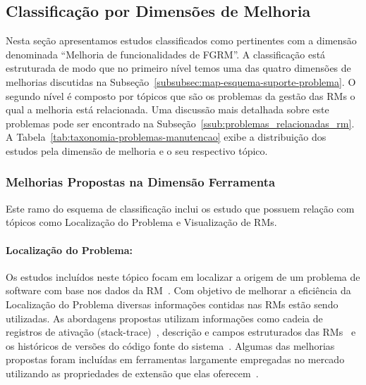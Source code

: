 \subsection{Classificação por Dimensões de Melhoria}
\label{sub:extensões_para_problemas_na_manutenção_de_software}

Nesta seção apresentamos estudos classificados como pertinentes com a dimensão
denominada ``Melhoria de funcionalidades de FGRM\@''. A classificação está
estruturada de modo que no primeiro nível temos uma das quatro dimensões de
melhorias discutidas na Subseção~\ref{subsubsec:map-esquema-suporte-problema}. O
segundo nível é composto por tópicos que são os problemas da gestão das RMs o
qual a melhoria está relacionada. Uma discussão mais detalhada sobre este
problemas pode ser encontrado na Subseção~\ref{ssub:problemas_relacionadas_rm}.
A Tabela~\ref{tab:taxonomia-problemas-manutencao} exibe a distribuição dos
estudos pela dimensão de melhoria e o seu respectivo tópico.



\subsubsection{Melhorias Propostas na Dimensão Ferramenta}
\label{ssub:melhorias_dim_ferramenta}

Este ramo do esquema de classificação inclui os estudo que possuem relação com
tópicos como Localização do Problema e Visualização de RMs.

\paragraph{Localização do Problema:} Os estudos incluídos neste tópico focam em
localizar a origem de um problema de software com base nos dados da
RM~\cite{Hovemeyer:2004:FBE:1052883.1052895}. Com objetivo de melhorar a
eficiência da Localização do Problema diversas informações contidas nas RMs
estão sendo utilizadas. As abordagens propostas utilizam informações como cadeia
de registros de ativação (stack-trace)~\cite{Wong:2014:BBF:2705615.2706096},
des\-cri\-ção e campos estruturados das
RMs~\cite{Thung:2014:BIT:2635868.2661678} e os históricos de versões do código
fonte do sistema~\cite{Bangcharoensap:2012:LSC:2419061.2419428,
	corley2011recovering, Romo:2015:TAT:2745802.2745833}. Algumas das melhorias
propostas foram incluídas em ferramentas largamente empregadas no mercado
utilizando as propriedades de extensão que elas
oferecem~\cite{Thung:2014:BIT:2635868.2661678,corley2011recovering}.


